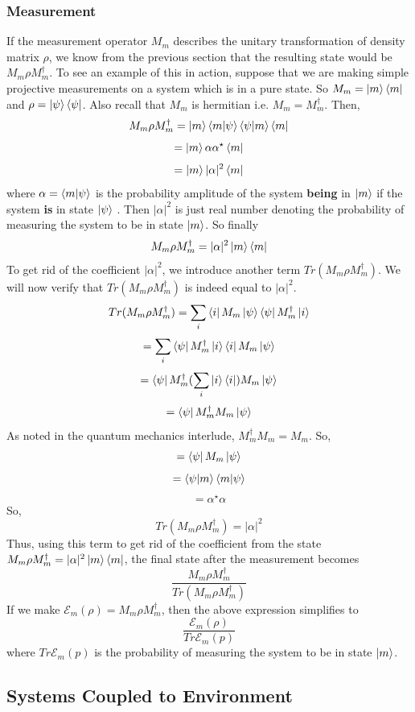 \documentclass{article}
\begin{document}
\subsubsection{Measurement}
If the measurement operator \(M_m\) describes the unitary transformation of density matrix \(\rho\), we know from
the previous section that the resulting state would be
\(M_m\rho M_m^{\dagger}\). To see an example of this
in action, suppose that we are making simple projective
measurements on a system which is in a pure state. So
\(M_m = \ket{m}\bra{m}\) and \(\rho = \ket{\psi}\bra{\psi}\).
Also recall that \(M_m\) is hermitian i.e. \(M_m = M_m^{\dagger}\). Then,
\[M_m\rho M_m^{\dagger} = \ket{m}\bra{m}\ket{\psi}\bra{\psi}\ket{m}\bra{m}\]
\[= \ket{m}\alpha\alpha^{\star}\bra{m}\]
\[= \ket{m}|\alpha|^2\bra{m}\]
where \(\alpha = \bra{m}\ket{\psi}\) is the probability amplitude of
the system \textbf{being} in \(\ket{m}\)
if the system \textbf{is} in state \(\ket{\psi}\) . Then \(|\alpha|^2\)
is just real number denoting the probability of measuring the system to be in state
\(\ket{m}\). So finally
\[M_m\rho M_m^{\dagger} = |\alpha|^2\ket{m}\bra{m}\]
To get rid of the coefficient \(|\alpha|^2\), we introduce another term
\(Tr(M_m\rho M_m^{\dagger})\). We will now verify that \(Tr(M_m\rho M_m^{\dagger})\)
is indeed equal to \(|\alpha|^2\).
\[Tr(M_m\rho M_m^{\dagger}) = \sum_i \bra{i}M_m\ket{\psi}\bra{\psi}M_m^{\dagger}\ket{i}\]
\[= \sum_i \bra{\psi}M_m^{\dagger}\ket{i}\bra{i}M_m\ket{\psi}\]
\[= \bra{\psi}M_m^{\dagger}(\sum_i\ket{i}\bra{i})M_m\ket{\psi}\]
\[= \bra{\psi}M_m^{\dagger}M_m\ket{\psi}\]
As noted in the quantum mechanics interlude, \(M_m^{\dagger}M_m=M_m \). So,
\[= \bra{\psi}M_m\ket{\psi}\]
\[= \bra{\psi}\ket{m}\bra{m}\ket{\psi}\]
\[= \alpha^{\star}\alpha\]
So,
\[Tr(M_m\rho M_m^{\dagger}) = |\alpha|^2\]
Thus, using this term to get rid of the coefficient from the state \(M_m\rho M_m^{\dagger} = |\alpha|^2\ket{m}\bra{m}\),
the final state after the measurement becomes
\[\frac{M_m\rho M_m^{\dagger}}{Tr(M_m\rho M_m^{\dagger})}\]
If we make  \(\mathcal{E}_m(\rho) = M_m\rho M_m^{\dagger}\), then the
above expression simplifies to
\[\frac{\mathcal{E}_m(\rho)}{Tr \mathcal{E}_m(p)}\]
where \(Tr \mathcal{E}_m(p)\) is the probability of measuring the system to
be in state \(\ket{m}\).


\subsection{Systems Coupled to Environment}
\end{document}
